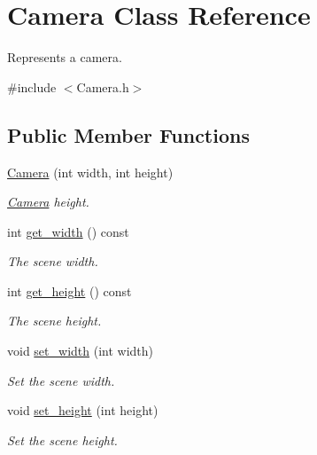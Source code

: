 \hypertarget{class_camera}{}\section{Camera Class Reference}
\label{class_camera}


Represents a camera.  




{\ttfamily \#include $<$Camera.\+h$>$}

\subsection*{Public Member Functions}
\begin{DoxyCompactItemize}
\item 
\mbox{\label{class_camera_ab8bd59938caefc7935fda5f5cfcb7a75}} 
\mbox{\hyperlink{class_camera_ab8bd59938caefc7935fda5f5cfcb7a75}{Camera}} (int width, int height)
\begin{DoxyCompactList}\small\item\em \mbox{\hyperlink{class_camera}{Camera}} height. \end{DoxyCompactList}\item 
int \mbox{\hyperlink{class_camera_ac987a00c51804d616aa9813acf3d1b5b}{get\+\_\+width}} () const
\begin{DoxyCompactList}\small\item\em The scene width. \end{DoxyCompactList}\item 
int \mbox{\hyperlink{class_camera_aa007c293cb55efbdf952c8827ada39fe}{get\+\_\+height}} () const
\begin{DoxyCompactList}\small\item\em The scene height. \end{DoxyCompactList}\item 
void \mbox{\hyperlink{class_camera_a0c86ad9f103e2e06cd83f7fc6e8e4c91}{set\+\_\+width}} (int width)
\begin{DoxyCompactList}\small\item\em Set the scene width. \end{DoxyCompactList}\item 
void \mbox{\hyperlink{class_camera_a32ef096bdf350255ff195cdaed585342}{set\+\_\+height}} (int height)
\begin{DoxyCompactList}\small\item\em Set the scene height. \end{DoxyCompactList}\end{DoxyCompactItemize}


